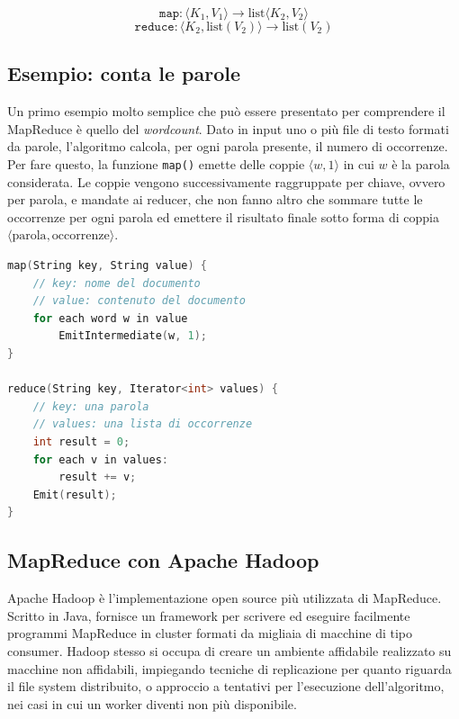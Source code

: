 \documentclass[a4paper,11pt,twoside,openright,fleqn]{book}
\newcommand{\code}[1]{\texttt{#1}}
\newcommand{\List}{\textrm{list}}
\newcommand{\pair}[2]{\langle #1, #2 \rangle}
\begin{document}
\begin{equation}
\texttt{map} : \pair{K_1}{V_1} \to \List\pair{K_2}{V_2}
\end{equation}
\begin{equation}
\texttt{reduce} : \pair{K_2}{\List(V_2)} \to \List(V_2)
\end{equation}

\subsection{Esempio: conta le parole}

Un primo esempio molto semplice che può essere presentato per comprendere il MapReduce è quello del \emph{wordcount}. Dato in input uno o più file di testo formati da parole, l'algoritmo calcola, per ogni parola presente, il numero di occorrenze. Per fare questo, la funzione \code{map()} emette delle coppie $\pair w 1$ in cui $w$ è la parola considerata. Le coppie vengono successivamente raggruppate per chiave, ovvero per parola, e mandate ai reducer, che non fanno altro che sommare tutte le occorrenze per ogni parola ed emettere il risultato finale sotto forma di coppia $\pair{\textrm{parola}}{\textrm{occorrenze}}$.

\begin{lstlisting}[float=htp,language=C++,caption=Pseudocodice per l'esempio wordcount]
map(String key, String value) {
	// key: nome del documento
	// value: contenuto del documento
	for each word w in value
		EmitIntermediate(w, 1);
}

reduce(String key, Iterator<int> values) {
	// key: una parola
	// values: una lista di occorrenze
	int result = 0;
	for each v in values:
		result += v;
	Emit(result);
}
\end{lstlisting}

\subsection{MapReduce con Apache Hadoop}

Apache Hadoop è l'implementazione open source più utilizzata di MapReduce. Scritto in Java, fornisce un framework per scrivere ed eseguire facilmente programmi MapReduce in cluster formati da migliaia di macchine di tipo consumer. Hadoop stesso si occupa di creare un ambiente affidabile realizzato su macchine non affidabili, impiegando tecniche di replicazione per quanto riguarda il file system distribuito, o approccio a tentativi per l'esecuzione dell'algoritmo, nei casi in cui un worker diventi non più disponibile.
\end{document}
